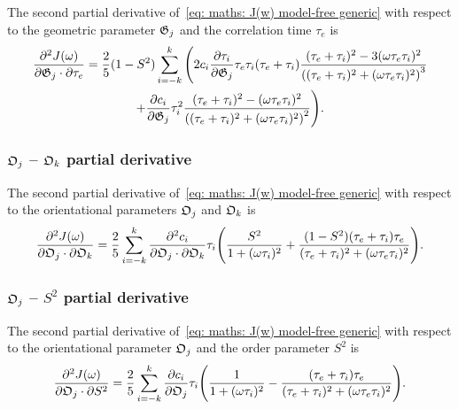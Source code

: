 The second partial derivative of~\eqref{eq: maths: J(w) model-free generic} with respect to the geometric parameter $\mathfrak{G}_j$ and the correlation time $\tau_e$ is
\begin{multline}
    \frac{\partial^2 J(\omega)}{\partial \mathfrak{G}_j \cdot \partial \tau_e} = \frac{2}{5} (1 - S^2) \sum_{i=-k}^k \Bigg(
        2 c_i \frac{\partial \tau_i}{\partial \mathfrak{G}_j} \tau_e \tau_i (\tau_e + \tau_i)
            \frac{(\tau_e + \tau_i)^2 - 3(\omega \tau_e \tau_i)^2}{\left((\tau_e + \tau_i)^2 + (\omega \tau_e \tau_i)^2 \right)^3}  \\
        + \frac{\partial c_i}{\partial \mathfrak{G}_j} \tau_i^2 \frac{(\tau_e + \tau_i)^2 - (\omega \tau_e \tau_i)^2}{\left((\tau_e + \tau_i)^2 + (\omega \tau_e \tau_i)^2 \right)^2}
    \Bigg).
\end{multline}


\subsubsection{$\mathfrak{O}_j$ -- $\mathfrak{O}_k$ partial derivative}

The second partial derivative of~\eqref{eq: maths: J(w) model-free generic} with respect to the orientational parameters $\mathfrak{O}_j$ and $\mathfrak{O}_k$ is
\begin{equation}
    \frac{\partial^2 J(\omega)}{\partial \mathfrak{O}_j \cdot \partial \mathfrak{O}_k} = \frac{2}{5} \sum_{i=-k}^k
        \frac{\partial^2 c_i}{\partial \mathfrak{O}_j \cdot \partial \mathfrak{O}_k} \tau_i \Bigg(
            \frac{S^2}{1 + (\omega \tau_i)^2}
            + \frac{(1 - S^2)(\tau_e + \tau_i)\tau_e}{(\tau_e + \tau_i)^2 + (\omega \tau_e \tau_i)^2}
        \Bigg).
\end{equation}



\subsubsection{$\mathfrak{O}_j$ -- $S^2$ partial derivative}

The second partial derivative of~\eqref{eq: maths: J(w) model-free generic} with respect to the orientational parameter $\mathfrak{O}_j$ and the order parameter $S^2$ is
\begin{equation}
    \frac{\partial^2 J(\omega)}{\partial \mathfrak{O}_j \cdot \partial S^2} = \frac{2}{5} \sum_{i=-k}^k \frac{\partial c_i}{\partial \mathfrak{O}_j} \tau_i \Bigg(
        \frac{1}{1 + (\omega \tau_i)^2}
        - \frac{(\tau_e + \tau_i)\tau_e}{(\tau_e + \tau_i)^2 + (\omega \tau_e \tau_i)^2}
    \Bigg).
\end{equation}



